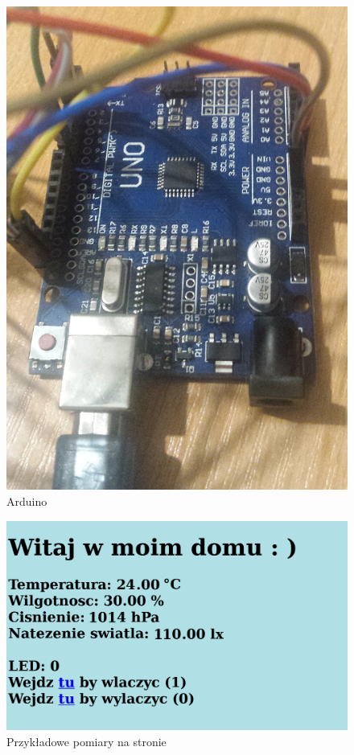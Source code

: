 \documentclass[polish, 11pt]{article}
\begin{document}
\begin{figure}[H]
    \centering
    \includegraphics[scale=0.5]{arduino.png}
\caption{Arduino}
\end{figure}

\begin{figure}[H]
    \centering
    \includegraphics[scale=0.2]{view.png}
\caption{Przykładowe pomiary na stronie}
\end{figure}
\end{document}
